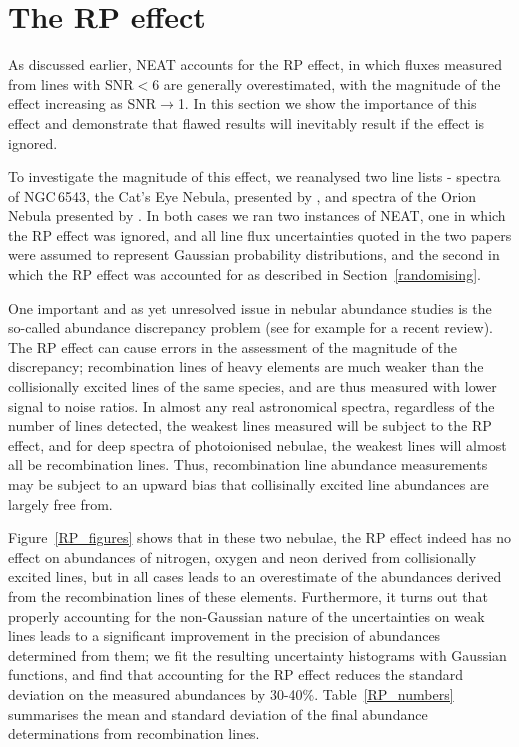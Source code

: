 \documentclass[useAMS,usenatbib]{mn2e}
\begin{document}
\section{The RP effect}

As discussed earlier, NEAT accounts for the RP effect, in which fluxes measured from lines with SNR$<$6 are generally overestimated, with the magnitude of the effect increasing as SNR$\to$1.  In this section we show the importance of this effect and demonstrate that flawed results will inevitably result if the effect is ignored.

To investigate the magnitude of this effect, we reanalysed two line lists - spectra of NGC\,6543, the Cat's Eye Nebula, presented by \citet{2004MNRAS.351.1026W}, and spectra of the Orion Nebula presented by \citet{2004MNRAS.355..229E}.  In both cases we ran two instances of NEAT, one in which the RP effect was ignored, and all line flux uncertainties quoted in the two papers were assumed to represent Gaussian probability distributions, and the second in which the RP effect was accounted for as described in Section~\ref{randomising}.

One important and as yet unresolved issue in nebular abundance studies is the so-called abundance discrepancy problem (see for example \citet{2006IAUS..234..219L} for a recent review).  The RP effect can cause errors in the assessment of the magnitude of the discrepancy; recombination lines of heavy elements are much weaker than the collisionally excited lines of the same species, and are thus measured with lower signal to noise ratios.  In almost any real astronomical spectra, regardless of the number of lines detected, the weakest lines measured will be subject to the RP effect, and for deep spectra of photoionised nebulae, the weakest lines will almost all be recombination lines.  Thus, recombination line abundance measurements may be subject to an upward bias that collisinally excited line abundances are largely free from.

Figure~\ref{RP_figures} shows that in these two nebulae, the RP effect indeed has no effect on abundances of nitrogen, oxygen and neon derived from collisionally excited lines, but in all cases leads to an overestimate of the abundances derived from the recombination lines of these elements.  Furthermore, it turns out that properly accounting for the non-Gaussian nature of the uncertainties on weak lines leads to a significant improvement in the precision of abundances determined from them; we fit the resulting uncertainty histograms with Gaussian functions, and find that accounting for the RP effect reduces the standard deviation on the measured abundances by 30-40\%.  Table~\ref{RP_numbers} summarises the mean and standard deviation of the final abundance determinations from recombination lines.
\end{document}
